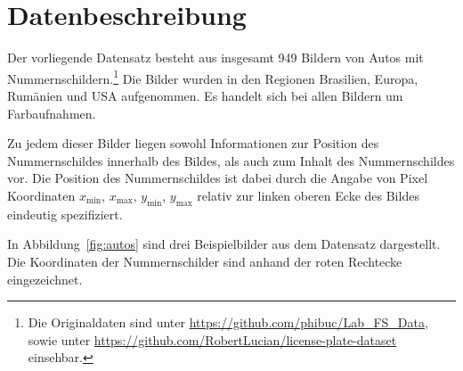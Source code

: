 \section{Datenbeschreibung}
\label{sec:Datenbeschreibung}

Der vorliegende Datensatz besteht aus insgesamt 949 Bildern von Autos mit
Nummernschildern.\footnote{Die Originaldaten sind unter \url{https://github.com/phibuc/Lab_FS_Data},
    sowie unter \url{https://github.com/RobertLucian/license-plate-dataset}
    einsehbar.}
Die Bilder wurden in den Regionen Brasilien, Europa, Rum\"anien und USA
aufgenommen. Es handelt sich bei allen Bildern um Farbaufnahmen.

Zu jedem dieser Bilder liegen sowohl Informationen zur Position
des Nummernschildes innerhalb des Bildes, als auch zum
Inhalt des Nummernschildes vor.
Die Position des Nummernschildes ist dabei durch die Angabe von Pixel Koordinaten
$x_{\text{min}}$, $x_{\text{max}}$, $y_{\text{min}}$, $y_{\text{max}}$
relativ zur linken oberen Ecke des Bildes eindeutig spezifiziert.

In Abbildung~\ref{fig:autos} sind drei Beispielbilder aus dem Datensatz
dargestellt. Die Koordinaten der Nummernschilder sind anhand der
roten Rechtecke eingezeichnet.

